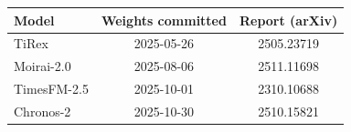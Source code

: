 \begin{tabular}{lcc}
\toprule
Model & Weights committed & Report (arXiv) \\
\midrule
TiRex & 2025-05-26 & 2505.23719 \\
Moirai-2.0 & 2025-08-06 & 2511.11698 \\
TimesFM-2.5 & 2025-10-01 & 2310.10688 \\
Chronos-2 & 2025-10-30 & 2510.15821 \\
\bottomrule
\end{tabular}
